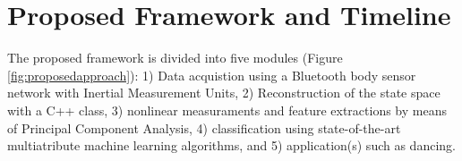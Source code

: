 
\chapter{Proposed Framework and Timeline}

\ifpdf
    \graphicspath{{Chapter3/Figs/Raster/}{Chapter3/Figs/PDF/}{Chapter3/Figs/}}
\else
    \graphicspath{{Chapter3/Figs/Vector/}{Chapter3/Figs/}}
\fi

The proposed framework is divided into five modules (Figure \ref{fig:proposedapproach}): 
1) Data acquistion using a Bluetooth body sensor network with Inertial Measurement Units, 
2) Reconstruction of the state space with a C++ class, 
3) nonlinear measuraments and feature extractions by means of Principal Component
Analysis, 
4) classification using state-of-the-art multiatribute machine learning algorithms, 
and  5) application(s) such as dancing. 

